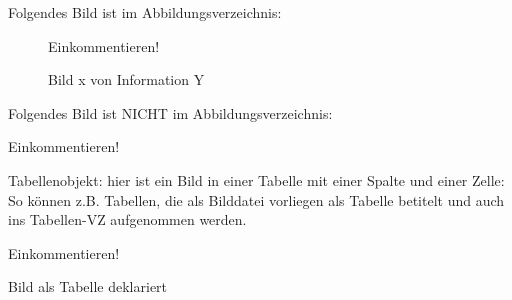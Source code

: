 \documentclass[12pt,oneside,a4paper,bibtotoc,liststotoc,pointlessnumbers]{scrartcl}
\begin{document}
\begin{appendix}
\nocite{*}

\newpage
Folgendes Bild ist im Abbildungsverzeichnis:
\begin{figure}[h]							
\centering 
Einkommentieren!
\caption{Bild x von Information Y}									%
\label{fig:LogoGD}												%
\end{figure}

Folgendes Bild ist NICHT im Abbildungsverzeichnis: \\ %
\begin{center}
Einkommentieren!
\end{center}

Tabellenobjekt: hier ist ein Bild in einer Tabelle mit einer Spalte und einer Zelle:
So können z.B. Tabellen, die als Bilddatei vorliegen als Tabelle betitelt und auch ins Tabellen-VZ aufgenommen werden.
\begin{table}[h]							
\centering 
Einkommentieren!
\caption{Bild als Tabelle deklariert}									%
\label{fig:LogoGD}												%
\end{table}




\end{appendix}

\end{document}
